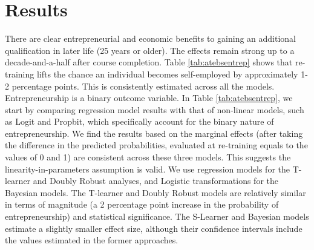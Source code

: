 \documentclass[12pt, a4paper]{article}
\begin{document}
\section{Results}

There are clear entrepreneurial and economic benefits to gaining an additional qualification in later life (25 years or older). The effects remain strong up to a decade-and-a-half after course completion. Table \ref{tab:atebsentrep} shows that re-training lifts the chance an individual becomes self-employed by approximately 1-2 percentage points. This is consistently estimated across all the models. Entrepreneurship is a binary outcome variable. In Table \ref{tab:atebsentrep}, we start by comparing regression model results with that of non-linear models, such as Logit and Propbit, which specifically account for the binary nature of entrepreneurship. We find the results based on the marginal effects (after taking the difference in the predicted probabilities, evaluated at re-training equals to the values of 0 and 1) are consistent across these three models. This suggests the linearity-in-parameters assumption is valid. We use regression models for the T-learner and Doubly Robust analyses, and Logistic transformations for the Bayesian models. The T-learner and Doubly Robust models are relatively similar in terms of magnitude (a 2 percentage point increase in the probability of entrepreneurship) and statistical significance. The S-Learner and Bayesian models estimate a slightly smaller effect size, although their confidence intervals include the values estimated in the former approaches.
\end{document}
